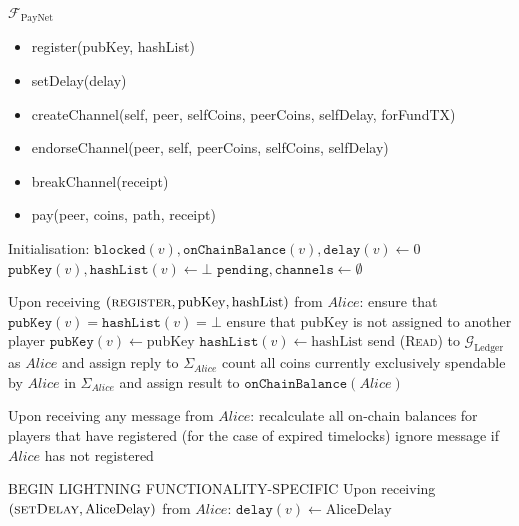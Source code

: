 \begin{functionality}{$\mathcal{F}_{\mathrm{PayNet}}$}
  \label{alg:payfunc}
    \begin{itemize}
      \item register(pubKey, hashList)
      \item setDelay(delay)
      \item createChannel(self, peer, selfCoins, peerCoins, selfDelay, forFundTX)
      \item endorseChannel(peer, self, peerCoins, selfCoins, selfDelay)
      \item breakChannel(receipt)
      \item pay(peer, coins, path, receipt)
    \end{itemize}

  \begin{algorithmic}[1]
    \State Initialisation:
      \Indent
        \State $\mathtt{blocked}\left(v\right),
        \mathtt{onChainBalance}\left(v\right), \mathtt{delay}\left(v\right)
        \gets 0$
        \State $\mathtt{pubKey}\left(v\right), \mathtt{hashList}\left(v\right)
        \gets \bot$
      \EndFor
      \State $\mathtt{pending}, \mathtt{channels} \gets \emptyset$
      \EndIndent
    \State

    \State Upon receiving $\left(\textsc{register}, \mathrm{pubKey},
    \mathrm{hashList}\right)$ from $Alice$:
    \Indent
      \State ensure that $\mathtt{pubKey}\left(v\right) =
      \mathtt{hashList}\left(v\right) = \bot$
      \State ensure that pubKey is not assigned to another player
      \State $\mathtt{pubKey}\left(v\right) \gets \mathrm{pubKey}$
      \State $\mathtt{hashList}\left(v\right) \gets \mathrm{hashList}$
      \State send (\textsc{Read}) to $\mathcal{G}_{\mathrm{Ledger}}$ as $Alice$
      and assign reply to $\Sigma_{Alice}$
      \State count all coins currently exclusively spendable by $Alice$ in
      $\Sigma_{Alice}$ and assign result to
      $\mathtt{onChainBalance}\left(Alice\right)$
    \EndIndent
    \State

    \State Upon receiving any message from $Alice$:
    \Indent
      \State recalculate all on-chain balances for players that have registered
      (for the case of expired timelocks)
      \State ignore message if $Alice$ has not registered
    \EndIndent
    \State

    \State BEGIN LIGHTNING FUNCTIONALITY-SPECIFIC
    \State Upon receiving $\left(\textsc{setDelay}, \mathrm{AliceDelay}\right)$
    from $Alice$:
    \Indent
      \State $\mathtt{delay}\left(v\right) \gets \mathrm{AliceDelay}$
    \EndIndent
    \State


\end{algorithmic}
\end{functionality}
